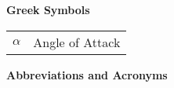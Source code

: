 \documentclass[conf]{new-aiaa}
\begin{document}
{\begin{longtable*}{@{}l @{\quad=\quad} l@{}}
\end{longtable*}}
\hspace{-0.5in}\textbf{Greek Symbols}
{\renewcommand\arraystretch{1.0}
\noindent\begin{longtable*}{@{}l @{\quad=\quad} l@{}}
    $\alpha$ & Angle of Attack \\
\end{longtable*}}
\hspace{-0.5in}\textbf{Abbreviations and Acronyms}
\end{document}
